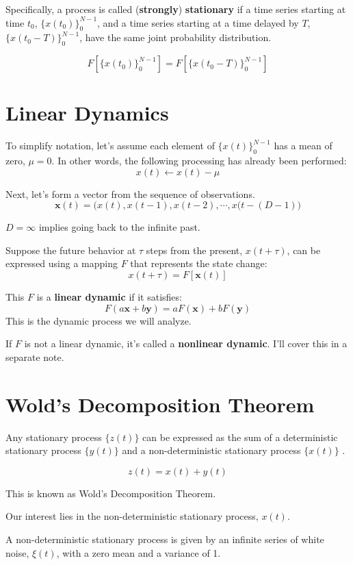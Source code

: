\documentclass[uplatex,a4j,12pt,dvipdfmx]{jsarticle}
\begin{document}
Specifically, a process is called (\textbf{strongly}) \textbf{stationary} if a time series starting at time $t_{0}$, $\{ x(t_{0}) \}^{N-1}_{0}$, and a time series starting at a time delayed by $T$, $\{ x(t_{0}-T) \}^{N-1}_{0}$, have the same joint probability distribution.

\[
	F[ \{ x(t_{0}) \}^{N-1}_{0} ] = F[ \{ x(t_{0}-T) \}^{N-1}_{0} ]
\]


\section{Linear Dynamics}

To simplify notation, let's assume each element of $\{ x(t) \}^{N-1}_{0}$ has a mean of zero, $\mu=0$. In other words, the following processing has already been performed:
\[
	x(t) \leftarrow x(t) - \mu
\]

Next, let's form a vector from the sequence of observations.
\[
	\mathbf{x}(t) = \Big( x(t), x(t-1) , x(t-2) , \cdots , x(t -(D-1) \Big)
\]

$D = \infty$ implies going back to the infinite past.

Suppose the future behavior at $\tau$ steps from the present, $x(t+\tau)$, can be expressed using a mapping $F$ that represents the state change:
\[
	x(t+\tau) = F[ \mathbf{x}(t) ]
\]

This $F$ is a \textbf{linear dynamic} if it satisfies:
\[
	F(a \mathbf{x} + b \mathbf{y}) =
	a F(\mathbf{x}) + b F(\mathbf{y})
\]
This is the dynamic process we will analyze.

If $F$ is not a linear dynamic, it's called a \textbf{nonlinear dynamic}. I'll cover this in a separate note.


\section{Wold's Decomposition Theorem}

Any stationary process $\{ z(t) \}$ can be expressed as the sum of a deterministic stationary process $\{ y(t) \}$ and a non-deterministic stationary process $\{ x(t) \}$ \cite{BoxJenkins1994}.

\[
	z(t) = x(t) + y(t)
\]


This is known as Wold's Decomposition Theorem.

Our interest lies in the non-deterministic stationary process, $x(t)$.


A non-deterministic stationary process is given by an infinite series of white noise, $\xi(t)$, with a zero mean and a variance of 1.
\end{document}
